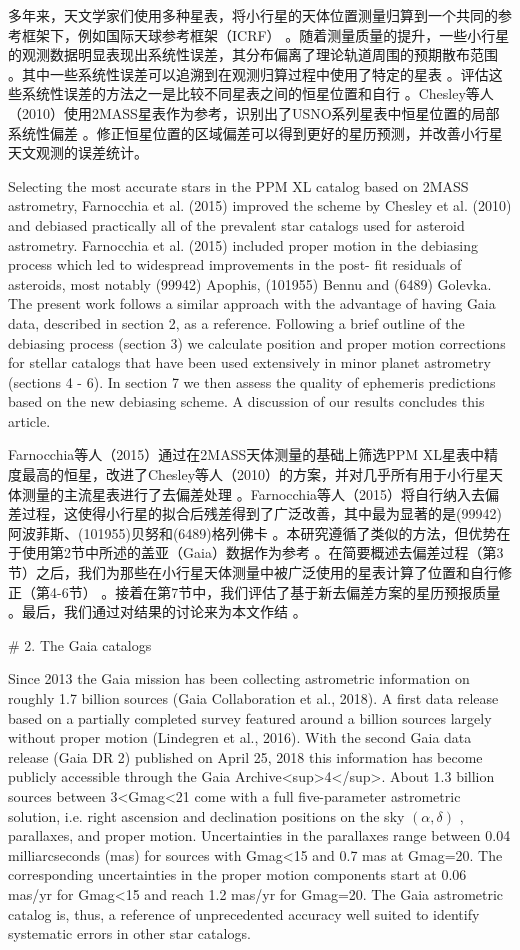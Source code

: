 多年来，天文学家们使用多种星表，将小行星的天体位置测量归算到一个共同的参考框架下，例如国际天球参考框架（ICRF） 。随着测量质量的提升，一些小行星的观测数据明显表现出系统性误差，其分布偏离了理论轨道周围的预期散布范围 。其中一些系统性误差可以追溯到在观测归算过程中使用了特定的星表 。评估这些系统性误差的方法之一是比较不同星表之间的恒星位置和自行 。Chesley等人（2010）使用2MASS星表作为参考，识别出了USNO系列星表中恒星位置的局部系统性偏差 。修正恒星位置的区域偏差可以得到更好的星历预测，并改善小行星天文观测的误差统计。

Selecting the most accurate stars in the PPM XL catalog based on 2MASS astrometry, Farnocchia et al. (2015) improved the scheme by Chesley et al. (2010) and debiased practically all of the prevalent star catalogs used for asteroid astrometry. Farnocchia et al. (2015) included proper motion in the debiasing process which led to widespread improvements in the post- fit residuals of asteroids, most notably (99942) Apophis, (101955) Bennu and (6489) Golevka. The present work follows a similar approach with the advantage of having Gaia data, described in section 2, as a reference. Following a brief outline of the debiasing process (section 3) we calculate position and proper motion corrections for stellar catalogs that have been used extensively in minor planet astrometry (sections 4 - 6). In section 7 we then assess the quality of ephemeris predictions based on the new debiasing scheme. A discussion of our results concludes this article.

Farnocchia等人（2015）通过在2MASS天体测量的基础上筛选PPM XL星表中精度最高的恒星，改进了Chesley等人（2010）的方案，并对几乎所有用于小行星天体测量的主流星表进行了去偏差处理 。Farnocchia等人（2015）将自行纳入去偏差过程，这使得小行星的拟合后残差得到了广泛改善，其中最为显著的是(99942)阿波菲斯、(101955)贝努和(6489)格列佛卡 。本研究遵循了类似的方法，但优势在于使用第2节中所述的盖亚（Gaia）数据作为参考 。在简要概述去偏差过程（第3节）之后，我们为那些在小行星天体测量中被广泛使用的星表计算了位置和自行修正（第4-6节） 。接着在第7节中，我们评估了基于新去偏差方案的星历预报质量 。最后，我们通过对结果的讨论来为本文作结 。

# 2. The Gaia catalogs

Since 2013 the Gaia mission has been collecting astrometric information on roughly 1.7 billion sources (Gaia Collaboration et al., 2018). A first data release based on a partially completed survey featured around a billion sources largely without proper motion (Lindegren et al., 2016). With the second Gaia data release (Gaia DR 2) published on April 25, 2018 this information has become publicly accessible through the Gaia Archive<sup>4</sup>. About 1.3 billion sources between 3<Gmag<21 come with a full five-parameter astrometric solution, i.e. right ascension and declination positions on the sky  $(\alpha , \delta)$ , parallaxes, and proper motion. Uncertainties in the parallaxes range between 0.04 milliarcseconds (mas) for sources with Gmag<15 and 0.7 mas at Gmag=20. The corresponding uncertainties in the proper motion components start at 0.06 mas/yr for Gmag<15 and reach 1.2 mas/yr for Gmag=20. The Gaia astrometric catalog is, thus, a reference of unprecedented accuracy well suited to identify systematic errors in other star catalogs.

